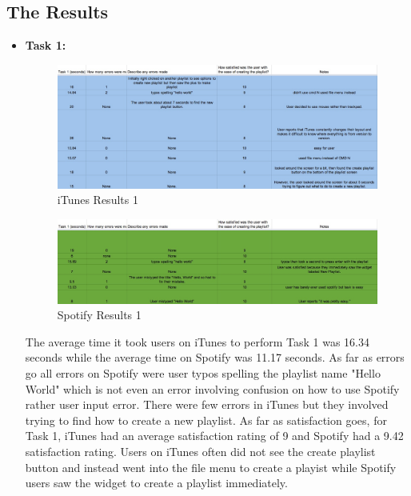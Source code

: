 \documentclass[a4paper]{article}
\begin{document}
\subsection{The Results}
  \begin{itemize}
      \item \textbf{Task 1:}
      
          \begin{figure}[H]
              \centering
              \includegraphics[width=1\textwidth]{itunestask1_copy.jpg}
              \caption{\label{tasks: task1itunes}iTunes Results 1}
          \end{figure}
          \begin{figure}[H]
              \centering
              \includegraphics[width=1\textwidth]{spotifytask1_copy.jpg}
              \caption{\label{tasks: task1spotify}Spotify Results 1}
          \end{figure}
    
      The average time it took users on iTunes to perform Task 1 was 16.34 seconds while the average time on Spotify was 11.17 seconds. As far as errors go all errors on Spotify were user typos spelling the playlist name "Hello World" which is not even an error involving confusion on how to use Spotify rather user input error. There were few errors in iTunes but they involved trying to find how to create a new playlist. As far as satisfaction goes, for Task 1, iTunes had an average satisfaction rating of 9 and Spotify had a 9.42 satisfaction rating. Users on iTunes often did not see the create playlist button and instead went into the file menu to create a playist while Spotify users saw the widget to create a playlist immediately.\\
    

\end{itemize}
\end{document}
